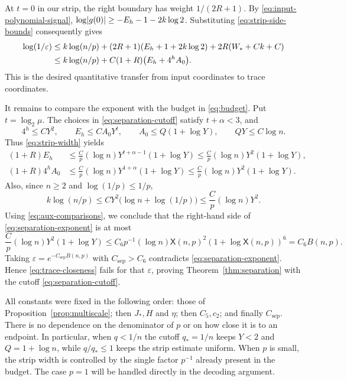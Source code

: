 At $t=0$ in our strip, the right boundary has weight $1/(2R+1)$.
By \eqref{eq:input-polynomial-signal},
$\log\lvert g(0)\rvert\ge-E_h-1-2k\log2$.
Substituting \eqref{eq:strip-side-bounds} consequently gives
\begin{align}
 \log(1/\varepsilon)
 &\le k\log(n/p)+(2R+1)(E_h+1+2k\log2)
             +2R(W_*+Ck+C)\notag\\
 &\le k\log(n/p)
       +C(1+R)\bigl(E_h+4^hA_0\bigr).
 \label{eq:separation-exponent}
\end{align}
This is the desired quantitative transfer from input coordinates to
trace coordinates.

It remains to compare the exponent with the budget in
\eqref{eq:budget}.  Put $t=\log_2\mu$.  The choices in
\eqref{eq:separation-cutoff} satisfy $t+\alpha<3$, and
\[
 4^h\le CY^2,\qquad E_h\le CA_0Y^t,
 \qquad A_0\le Q(1+\log Y),\qquad QY\le C\log n.
\]
Thus \eqref{eq:strip-width} yields
\begin{align*}
 (1+R)E_h
 &\le \frac Cp(\log n)Y^{t+\alpha-1}(1+\log Y)
 \le \frac Cp(\log n)Y^2(1+\log Y),\\
 (1+R)4^hA_0
 &\le \frac Cp(\log n)Y^{1+\alpha}(1+\log Y)
 \le \frac Cp(\log n)Y^2(1+\log Y).
\end{align*}
Also, since $n\ge2$ and $\log(1/p)\le1/p$,
\[
 k\log(n/p)\le CY^2\bigl(\log n+\log(1/p)\bigr)
                \le \frac Cp(\log n)Y^2.
\]
Using \eqref{eq:aux-comparisons}, we conclude that the right-hand side
of \eqref{eq:separation-exponent} is at most
\begin{equation}
 \frac Cp(\log n)Y^2(1+\log Y)
 \le C_6 p^{-1}(\log n)\mathsf X(n,p)^2
                  (1+\log\mathsf X(n,p))^6
 =C_6B(n,p).
 \label{eq:final-B-bound}
\end{equation}
Taking $\varepsilon=e^{-C_{\mathrm{sep}}B(n,p)}$ with
$C_{\mathrm{sep}}>C_6$ contradicts
\eqref{eq:separation-exponent}.  Hence
\eqref{eq:trace-closeness} fails for that $\varepsilon$, proving
Theorem~\ref{thm:separation} with the cutoff
\eqref{eq:separation-cutoff}.

All constants were fixed in the following order: those of
Proposition~\ref{prop:multiscale}; then $J_*,H$ and $\eta$; then
$C_5,c_2$; and finally $C_{\mathrm{sep}}$.  There is no dependence on
the denominator of $p$ or on how close it is to an endpoint.
In particular, when $q<1/n$ the cutoff $q_*=1/n$ keeps $Y<2$ and
$Q=1+\log n$, while $q/q_*\le1$ keeps the strip estimate uniform.
When $p$ is small, the strip width is controlled by the single factor
$p^{-1}$ already present in the budget.  The case $p=1$ will be handled
directly in the decoding argument.
